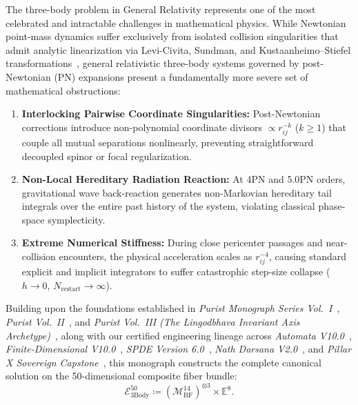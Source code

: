\documentclass[11pt,a4paper,reqno]{article}
\theoremstyle{plain}
\theoremstyle{definition}
\theoremstyle{remark}
\numberwithin{equation}{section}
\newcommand{\Mbf}{\mathcal{M}_{\mathrm{BF}}^{14}}
\newcommand{\Ebody}{\mathcal{E}^{50}_{\mathrm{3Body}}}
\begin{document}
The three-body problem in General Relativity represents one of the most celebrated and intractable challenges in mathematical physics. While Newtonian point-mass dynamics suffer exclusively from isolated collision singularities that admit analytic linearization via Levi-Civita, Sundman, and Kustaanheimo--Stiefel transformations~\cite{burdet1969, ferrandiz1988}, general relativistic three-body systems governed by post-Newtonian (PN) expansions present a fundamentally more severe set of mathematical obstructions:
\begin{enumerate}[label=\textbf{(\arabic*)}, leftmargin=2.2em]
  \item \textbf{Interlocking Pairwise Coordinate Singularities:} Post-Newtonian corrections introduce non-polynomial coordinate divisors $\propto r_{ij}^{-k}$ ($k \ge 1$) that couple all mutual separations nonlinearly, preventing straightforward decoupled spinor or focal regularization.
  \item \textbf{Non-Local Hereditary Radiation Reaction:} At 4PN and 5.0PN orders, gravitational wave back-reaction generates non-Markovian hereditary tail integrals over the entire past history of the system, violating classical phase-space symplecticity.
  \item \textbf{Extreme Numerical Stiffness:} During close pericenter passages and near-collision encounters, the physical acceleration scales as $r_{ij}^{-4}$, causing standard explicit and implicit integrators to suffer catastrophic step-size collapse ($h \to 0$, $N_{\mathrm{restart}} \to \infty$).
\end{enumerate}

Building upon the foundations established in \emph{Purist Monograph Series Vol.~I}~\cite{PuristVol1Monograph2026}, \emph{Purist Vol.~II}~\cite{PuristVol2Monograph2026}, and \emph{Purist Vol.~III (The Lingodbhava Invariant Axis Archetype)}~\cite{PuristVol3Monograph2026}, along with our certified engineering lineage across \emph{Automata V10.0}~\cite{AutomataV10Monograph2026}, \emph{Finite-Dimensional V10.0}~\cite{FiniteV10Monograph2026}, \emph{SPDE Version 6.0}~\cite{SPDEV60}, \emph{Nath Darsana V2.0}~\cite{NathDarsanaV2Monograph2026}, and \emph{Pillar X Sovereign Capstone}~\cite{PillarXMonograph2026}, this monograph constructs the complete canonical solution on the 50-dimensional composite fiber bundle:
\begin{equation}
  \Ebody \coloneqq \left( \Mbf \right)^{\otimes 3} \times \mathbb{E}^8.
  \label{eq:ebody_50d_def}
\end{equation}
\end{document}
